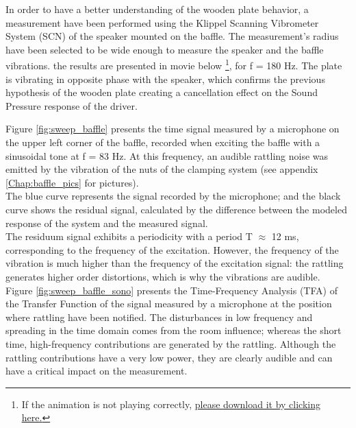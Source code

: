 \documentclass{report}
\newif\ifdraft
\begin{document}
In order to have a better understanding of the wooden plate behavior, a measurement have been performed using the Klippel Scanning Vibrometer System (SCN) of the speaker mounted on the baffle. The measurement's radius have been selected to be wide enough to measure the speaker and the baffle vibrations. the results are presented in movie below \footnote{If the animation is not playing correctly, \href{https://www.dropbox.com/sh/1jlodpb3biuxmhy/AADFRz8B249n8ERu3nkwyyisa?dl=0}{please download it by clicking \underline{here}.}}, for f = 180 Hz. The plate is vibrating in opposite phase with the speaker,  which confirms the previous hypothesis of the wooden plate creating a cancellation effect on the Sound Pressure response of the driver. 


\ifdraft
\begin{center}
	\includemovie[draft,repeat,poster,label=baffle_vib,text={\small(Click to start...)}]{7cm}{5cm}{GridOpti/baffle_vib.avi}
\end{center}
\else
\begin{center}
\end{center}
\fi

\vspace{0.4cm}

Figure \ref{fig:sweep_baffle} presents the time signal measured by a microphone on the upper left corner of the baffle, recorded when exciting the baffle with a sinusoidal tone at f = 83 Hz. At this frequency, an audible rattling noise was emitted by the vibration of the nuts of the clamping system (see appendix \ref{Chap:baffle_pics} for pictures).\\
The blue curve represents the signal recorded by the microphone; and the black curve shows the residual signal, calculated by the difference between the modeled response of the system and the measured signal. \\

The residuum signal exhibits a periodicity with a period T $\approx$ 12 ms, corresponding to the frequency of the excitation. However, the frequency of the vibration is much higher than the frequency of the excitation signal: the rattling generates higher order distortions, which is why the vibrations are audible.\\
Figure \ref{fig:sweep_baffle_sono} presents the Time-Frequency Analysis (TFA) of the Transfer Function of the signal measured by a microphone at the position where rattling have been notified. The disturbances in low frequency and spreading in the time domain comes from the room influence; whereas the short time, high-frequency contributions are generated by the rattling. Although the rattling contributions have a very low power, they are clearly audible and can have a critical impact on the measurement.\\
\end{document}
